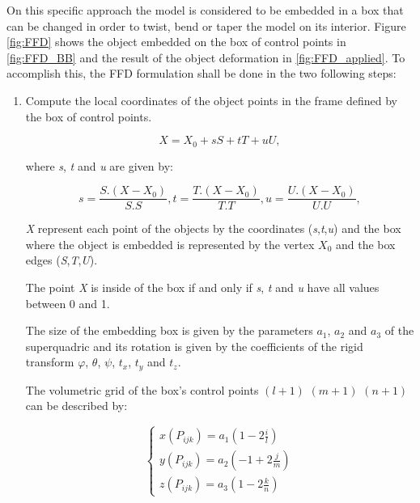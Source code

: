 On this specific approach the model is considered to be embedded in a box that can be changed in order to twist, bend or taper the model on its interior. Figure \ref{fig:FFD} shows the object embedded on the box of control points in \ref{fig:FFD_BB} and the result of the object deformation in \ref{fig:FFD_applied}. To accomplish this, the FFD formulation shall be done in the two following steps:

\begin{enumerate}
\item Compute the local coordinates of the object points in the frame defined by the box of control points.

\begin{equation}
X = X_{0} + s S + t T + u U,
\end{equation}

where \textit{s}, \textit{t} and \textit{u} are given by:

\begin{equation}
s = \frac{S. \left(X-X_{0} \right)}{S.S},   t = \frac{T. \left(X-X_{0} \right)}{T.T},   u = \frac{U. \left(X-X_{0} \right)}{U.U}, 
\end{equation}

\textit{X} represent each point of the objects by the coordinates (\textit{s},\textit{t},\textit{u}) and the box where the object is embedded is represented by the vertex \textit{$X_{0}$} and the box edges (\textit{S},\textit{T},\textit{U}).

The point \textit{X} is inside of the box if and only if \textit{s}, \textit{t} and \textit{u} have all values between 0 and 1.

The size of the embedding box is given by the parameters $a_{1}$, $a_{2}$ and $a_{3}$ of the superquadric and its rotation is given by the coefficients of the rigid transform $\varphi$, $\theta$, $\psi$, $t_{x}$, $t_{y}$ and $t_{z}$.

The volumetric grid of the box's control points $\left( l+1 \right)$ $\left( m+1 \right)$ $\left( n+1 \right)$ can be described by:

\begin{equation}
  \begin{cases}
  	x(\textbf{$P_{ijk}$}) = a_{1} \left(1-2 \frac{i}{l} \right) \\
  	y(\textbf{$P_{ijk}$}) = a_{2} \left(-1+2 \frac{j}{m} \right) \\
  	z(\textbf{$P_{ijk}$}) = a_{3} \left(1-2 \frac{k}{n} \right) 
  \end{cases}
\end{equation}


\end{enumerate}
